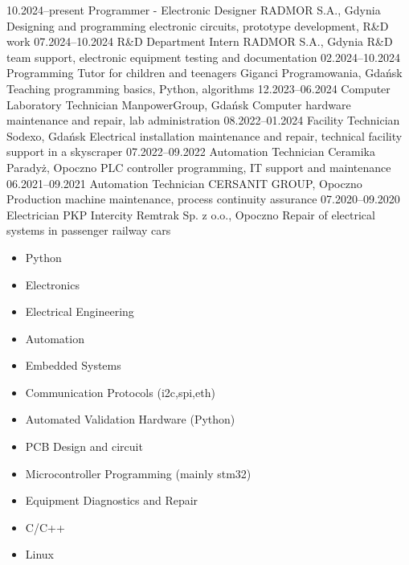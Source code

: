 \documentclass[9pt]{developercv}
\begin{document}

\begin{entrylist}
	\entry
		{10.2024--present}
		{Programmer - Electronic Designer}
		{RADMOR S.A., Gdynia}
		{Designing and programming electronic circuits, prototype development, R\&D work}
	\entry
		{07.2024--10.2024}
		{R\&D Department Intern}
		{RADMOR S.A., Gdynia}
		{R\&D team support, electronic equipment testing and documentation}
	\entry
		{02.2024--10.2024}
		{Programming Tutor for children and teenagers}
		{Giganci Programowania, Gdańsk}
		{Teaching programming basics, Python, algorithms}
	\entry
		{12.2023--06.2024}
		{Computer Laboratory Technician}
		{ManpowerGroup, Gdańsk}
		{Computer hardware maintenance and repair, lab administration}
	\entry
		{08.2022--01.2024}
		{Facility Technician}
		{Sodexo, Gdańsk}
		{Electrical installation maintenance and repair, technical facility support in a skyscraper}
	\entry
		{07.2022--09.2022}
		{Automation Technician}
		{Ceramika Paradyż, Opoczno}
		{PLC controller programming, IT support and maintenance}
	\entry
		{06.2021--09.2021}
		{Automation Technician}
		{CERSANIT GROUP, Opoczno}
		{Production machine maintenance, process continuity assurance}
	\entry
		{07.2020--09.2020}
		{Electrician}
		{PKP Intercity Remtrak Sp. z o.o., Opoczno}
		{Repair of electrical systems in passenger railway cars}
\end{entrylist}




\begin{minipage}[t]{0.48\textwidth}
\begin{itemize}
  \item Python
  \item Electronics
  \item Electrical Engineering
  \item Automation
  \item Embedded Systems
  \item Communication Protocols (i2c,spi,eth)
\end{itemize}
\end{minipage}%
\hfill
\begin{minipage}[t]{0.48\textwidth}
\begin{itemize}
  \item Automated Validation Hardware (Python)
  \item PCB Design and circuit
  \item Microcontroller Programming (mainly stm32)
  \item Equipment Diagnostics and Repair
  \item C/C++
  \item Linux
\end{itemize}
\end{minipage}
\end{document}
